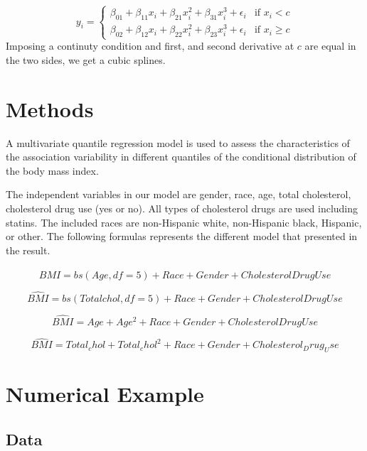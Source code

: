 \documentclass[
  12pt,
]{article}
\begin{document}
\begin{equation}
y_{i}=  
 \left\{
\begin{array}{ll}
 \beta_{01}+\beta_{11}x_i+\beta_{21}x_i^2+ \beta_{31}x_i^3+ \epsilon_i & \mbox{if } x_i< c \\
 \beta_{02}+\beta_{12}x_i+\beta_{22}x_i^2+ \beta_{23}x_i^3+ \epsilon_i& \mbox{if } x_i \geq c
\end{array}
\right.
\end{equation}
Imposing a continuty condition and first, and second derivative at \(c\) are equal in the two sides, we get a cubic splines.

\section{Methods}

A multivariate quantile regression model is used to assess the characteristics of the association variability in different quantiles of the conditional distribution of the body mass index.

The independent variables in our model are gender, race, age, total cholesterol, cholesterol drug use (yes or no). All types of cholesterol drugs are used including statins. The included races are non-Hispanic white, non-Hispanic black, Hispanic, or other. The following formulas represents the different model that presented in the result.

\begin{equation}
 \hat{BMI}= bs(Age, df = 5) + Race + Gender + Cholesterol Drug Use
 \end{equation}

\begin{equation}
 \hat{BMI}= bs(Total chol, df=5)+ Race + Gender + Cholesterol Drug Use
 \end{equation}

\begin{equation}
 \hat{BMI}= Age+Age^2+ Race + Gender + Cholesterol Drug Use 
 \end{equation}

\begin{equation}
 \hat{BMI}= Total_chol+ Total_chol^2+ Race + Gender + Cholesterol_Drug_Use
 \end{equation}

\section{Numerical Example}
\subsection{Data}
\end{document}
